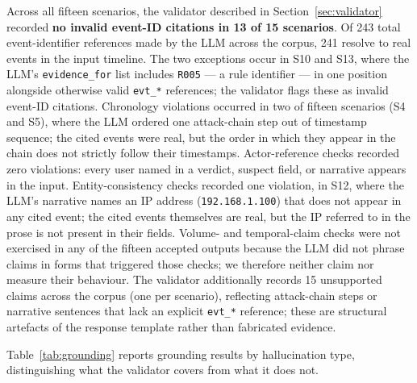 \documentclass[conference]{IEEEtran}
\begin{document}
Across all fifteen scenarios, the validator described in Section~\ref{sec:validator} recorded \textbf{no invalid event-ID citations in 13 of 15 scenarios}. Of 243 total event-identifier references made by the LLM across the corpus, 241 resolve to real events in the input timeline. The two exceptions occur in S10 and S13, where the LLM's \texttt{evidence\_for} list includes \texttt{R005} --- a rule identifier --- in one position alongside otherwise valid \texttt{evt\_*} references; the validator flags these as invalid event-ID citations. Chronology violations occurred in two of fifteen scenarios (S4 and S5), where the LLM ordered one attack-chain step out of timestamp sequence; the cited events were real, but the order in which they appear in the chain does not strictly follow their timestamps. Actor-reference checks recorded zero violations: every user named in a verdict, suspect field, or narrative appears in the input. Entity-consistency checks recorded one violation, in S12, where the LLM's narrative names an IP address (\texttt{192.168.1.100}) that does not appear in any cited event; the cited events themselves are real, but the IP referred to in the prose is not present in their fields. Volume- and temporal-claim checks were not exercised in any of the fifteen accepted outputs because the LLM did not phrase claims in forms that triggered those checks; we therefore neither claim nor measure their behaviour. The validator additionally records 15 unsupported claims across the corpus (one per scenario), reflecting attack-chain steps or narrative sentences that lack an explicit \texttt{evt\_*} reference; these are structural artefacts of the response template rather than fabricated evidence.

Table~\ref{tab:grounding} reports grounding results by hallucination type, distinguishing what the validator covers from what it does not.
\end{document}
